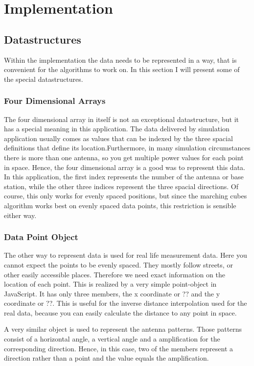 \chapter{Implementation}
\section{Datastructures}
Within the implementation the data needs to be represented in a way, that is convenient for the algorithms to work on. In this section I will present some of the special datastructures.
\subsection{Four Dimensional Arrays}
The four dimensional array in itself is not an exceptional datastructure, but it has a special meaning in this application. The data delivered by simulation application usually comes as values that can be indexed by the three spacial definitions that define its location.Furthermore, in many simulation circumstances there is more than one antenna, so you get multiple power values for each point in space. Hence, the four dimensional array is a good was to represent this data. In this application, the first index represents the number of the antenna or base station, while the other three indices represent the three spacial directions. Of course, this only works for evenly spaced  positions, but since the marching cubes algorithm works best on evenly spaced data points, this restriction is sensible either way.
\subsection{Data Point Object}
The other way to represent data is used for real life measurement data. Here you cannot expect the points to be evenly spaced. They mostly follow streets, or other easily accessible places. Therefore we need exact information on the location of each point. This is realized by a very simple point-object in JavaScript. It has only three members, the x coordinate or ?? and the y coordinate or ??. This is useful for the inverse distance interpolation used for the real data, because you can easily calculate the distance to any point in space.

A very similar object is used to represent the antenna patterns. Those patterns consist of a horizontal angle, a vertical angle and a amplification for the corresponding direction. Hence, in this case, two of the members represent a direction rather than a point and the value equals the amplification.
